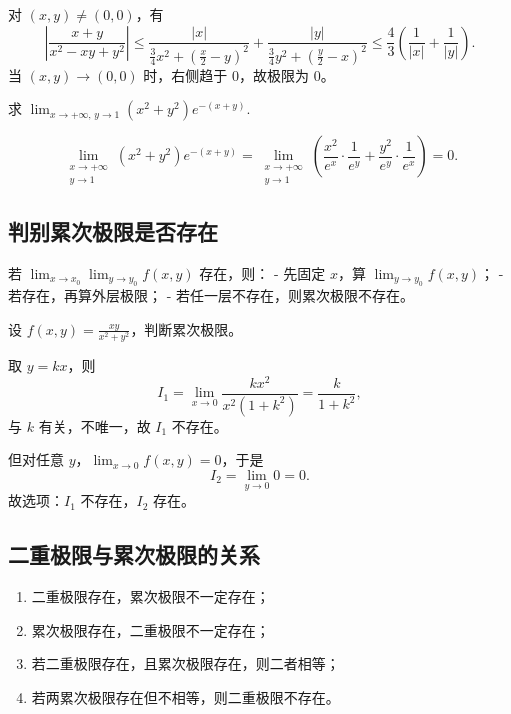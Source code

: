 \begin{solution}
    对 $(x,y)\ne(0,0)$，有
    $$
        \left| \frac{x+y}{x^2-xy+y^2} \right|
        \le \frac{|x|}{\frac{3}{4}x^2+\left(\frac{x}{2}-y\right)^2}
        + \frac{|y|}{\frac{3}{4}y^2+\left(\frac{y}{2}-x\right)^2}
        \le \frac{4}{3}\left(\frac{1}{|x|}+\frac{1}{|y|}\right).
    $$
    当 $(x,y)\to(0,0)$ 时，右侧趋于 $0$，故极限为 $0$。
\end{solution}

\begin{example}{}{}
    求 $\displaystyle \lim_{x\to+\infty,\,y\to1}(x^2+y^2)e^{-(x+y)}$.
\end{example}

\begin{solution}
    $$
        \lim_{\substack{x \to +\infty \\ y \to 1}}
        (x^2+y^2)e^{-(x+y)}
        =\lim_{\substack{x \to +\infty \\ y \to 1}}
        \left(\frac{x^2}{e^x}\cdot\frac{1}{e^y}+\frac{y^2}{e^y}\cdot\frac{1}{e^x}\right)=0.
    $$
\end{solution}


\subsection{判别累次极限是否存在}

若 $\displaystyle \lim_{x \to x_0}\lim_{y \to y_0} f(x,y)$ 存在，则：
- 先固定 $x$，算 $\lim_{y \to y_0} f(x,y)$；
- 若存在，再算外层极限；
- 若任一层不存在，则累次极限不存在。

\begin{example}{}{}
    设 $f(x,y)=\frac{xy}{x^2+y^2}$，判断累次极限。
\end{example}

\begin{solution}
    取 $y=kx$，则
    $$
        I_1=\lim_{x\to0}\frac{kx^2}{x^2(1+k^2)}=\frac{k}{1+k^2},
    $$
    与 $k$ 有关，不唯一，故 $I_1$ 不存在。

    但对任意 $y$，$\lim_{x\to0}f(x,y)=0$，于是
    $$
        I_2=\lim_{y\to0}0=0.
    $$
    故选项：$I_1$ 不存在，$I_2$ 存在。
\end{solution}


\subsection{二重极限与累次极限的关系}

\begin{enumerate}
    \item 二重极限存在，累次极限不一定存在；
    \item 累次极限存在，二重极限不一定存在；
    \item 若二重极限存在，且累次极限存在，则二者相等；
    \item 若两累次极限存在但不相等，则二重极限不存在。
\end{enumerate}

